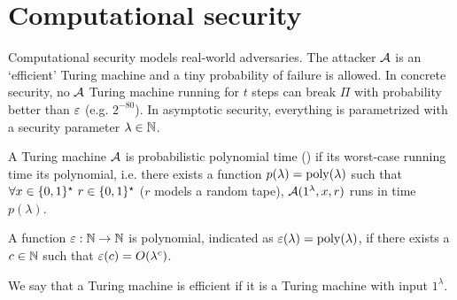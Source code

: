 
\section{Computational security}
Computational security models real-world adversaries.
The attacker $\mathcal{A}$ is an `efficient' Turing machine and a tiny probability of failure is allowed.
In concrete security, no $\mathcal{A}$ Turing machine running for $t$ steps can break $\Pi$ with probability better than $\varepsilon$ (e.g. $2^{-80}$).
In asymptotic security, everything is parametrized with a security parameter $\lambda \in \mathbb{N}$.

\begin{definition}
	A Turing machine $\mathcal{A}$ is probabilistic polynomial time (\ppt) if its worst-case running time its polynomial, i.e. there exists a function $p(\lambda) = \mathrm{poly}(\lambda)$ such that $\forall x \in \{0, 1\}^\star \ r \in \{0, 1\}^\star$ ($r$ models a random tape), $\mathcal{A}(1^\lambda, x, r)$ runs in time $p(\lambda)$.
\end{definition}
%
\begin{definition}
	A function $\varepsilon : \mathbb{N} \to \mathbb{N}$ is polynomial, indicated as $\varepsilon(\lambda) = \mathrm{poly}(\lambda)$, if there exists a $c \in \mathbb{N}$ such that $\varepsilon(c) = O(\lambda^c)$.
\end{definition}
%
\noindent We say that a Turing machine is efficient if it is a \ppt{} Turing machine with input $1^\lambda$.



